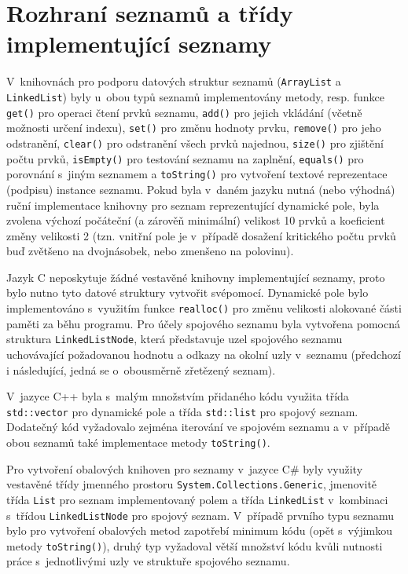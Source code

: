 \documentclass[czech,BP]{thesiskiv}
\begin{document}
\section{Rozhraní seznamů a třídy implementující seznamy}
V~knihovnách pro podporu datových struktur seznamů (\texttt{ArrayList} a \texttt{Linked\-List}) byly u~obou typů seznamů implementovány metody, resp. funkce \texttt{get()} pro operaci čtení prvků seznamu, \texttt{add()} pro jejich vkládání (včetně možnosti určení indexu), \texttt{set()} pro změnu hodnoty prvku, \texttt{remove()} pro jeho odstranění, \texttt{clear()} pro odstranění všech prvků najednou, \texttt{size()} pro zjištění počtu prvků, \texttt{isEmpty()} pro testování seznamu na zaplnění, \texttt{equals()} pro porovnání s~jiným seznamem a \texttt{toString()} pro vytvoření textové reprezentace (podpisu) instance seznamu. Pokud byla v~daném jazyku nutná (nebo výhodná) ruční implementace knihovny pro seznam reprezentující dynamické pole, byla zvolena výchozí počáteční (a zárověň minimální) velikost 10 prvků a koeficient změny velikosti 2 (tzn. vnitřní pole je v~případě dosažení kritického počtu prvků buď zvětšeno na dvojnásobek, nebo zmenšeno na polovinu).\par
Jazyk C neposkytuje žádné vestavěné knihovny implementující seznamy, proto bylo nutno tyto datové struktury vytvořit svépomocí. Dynamické pole bylo implementováno s~využitím funkce \texttt{realloc()} pro změnu velikosti alokované části paměti za běhu programu. Pro účely spojového seznamu byla vytvořena pomocná struktura \texttt{LinkedListNode}, která představuje uzel spojového seznamu uchovávající požadovanou hodnotu a odkazy na okolní uzly v~seznamu (předchozí i následující, jedná se o~obousměrně zřetězený seznam).\par
V~jazyce C++ byla s~malým množstvím přidaného kódu využita třída \texttt{std::vector} pro dynamické pole a třída \texttt{std::list} pro spojový seznam. Dodatečný kód vyžadovalo zejména iterování ve spojovém seznamu a v~případě obou seznamů také implementace metody \texttt{toString()}.\par
Pro vytvoření obalových knihoven pro seznamy v~jazyce C\# byly využity vestavěné třídy jmenného prostoru \texttt{System.Collections.Generic}, jmenovitě třída \texttt{List} pro seznam implementovaný polem a třída \texttt{LinkedList} v~kombinaci s~třídou \texttt{LinkedListNode} pro spojový seznam. V~případě prvního typu seznamu bylo pro vytvoření obalových metod zapotřebí minimum kódu (opět s~výjimkou metody \texttt{toString()}), druhý typ vyžadoval větší množství kódu kvůli nutnosti práce s~jednotlivými uzly ve struktuře spojového seznamu.\par
\end{document}
